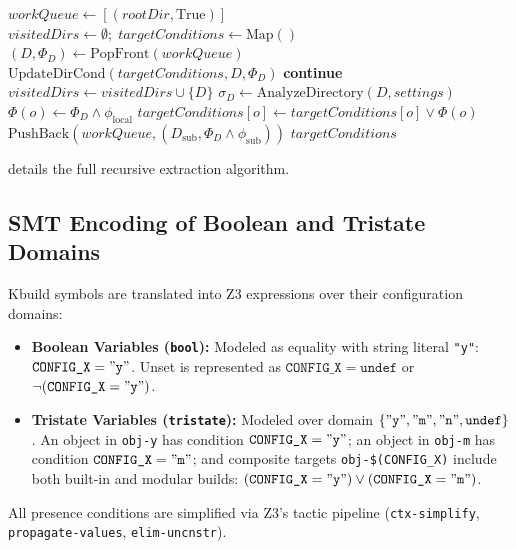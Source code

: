 \documentclass[acmsmall,screen,review]{acmart}
\begin{document}
\begin{algorithm}[t]
\caption{Recursive Hierarchy Traversal and Build Condition Extraction}
\label{alg:recursive-traversal}
\begin{algorithmic}[1]
  \State $\mathit{workQueue} \gets [(\mathit{rootDir}, \text{True})]$
  \State $\mathit{visitedDirs} \gets \emptyset; \; \mathit{targetConditions} \gets \text{Map}()$
    \State $(D, \Phi_D) \gets \mathrm{PopFront}(\mathit{workQueue})$
      \State $\mathrm{UpdateDirCond}(\mathit{targetConditions}, D, \Phi_D)$
      \State \textbf{continue}
    \EndIf
    \State $\mathit{visitedDirs} \gets \mathit{visitedDirs} \cup \{ D \}$
    \State $\sigma_D \gets \mathrm{AnalyzeDirectory}(D, \mathit{settings})$
      \State $\Phi(o) \gets \Phi_D \wedge \phi_{\text{local}}$
      \State $\mathit{targetConditions}[o] \gets \mathit{targetConditions}[o] \vee \Phi(o)$
    \EndFor
      \State $\mathrm{PushBack}(\mathit{workQueue}, (D_{\text{sub}}, \Phi_D \wedge \phi_{\text{sub}}))$
    \EndFor
  \EndWhile
  \State \Return $\mathit{targetConditions}$
\EndFunction
\end{algorithmic}
\end{algorithm}

 details the full recursive extraction algorithm.

\subsection{SMT Encoding of Boolean and Tristate Domains}
\label{sec:traversal:smt}

Kbuild symbols are translated into Z3 expressions over their configuration domains:
\begin{itemize}
\item \textbf{Boolean Variables (\texttt{bool}):} Modeled as equality with string literal \texttt{"y"}: $\texttt{CONFIG\_X} = \mathtt{"y"}$. Unset is represented as $\texttt{CONFIG\_X} = \mathtt{undef}$ or $\neg(\texttt{CONFIG\_X} = \mathtt{"y"})$.
\item \textbf{Tristate Variables (\texttt{tristate}):} Modeled over domain $\{ \mathtt{"y"}, \mathtt{"m"}, \mathtt{"n"}, \mathtt{undef} \}$. An object in \texttt{obj-y} has condition $\texttt{CONFIG\_X} = \mathtt{"y"}$; an object in \texttt{obj-m} has condition $\texttt{CONFIG\_X} = \mathtt{"m"}$; and composite targets \texttt{obj-\$(CONFIG\_X)} include both built-in and modular builds: $(\texttt{CONFIG\_X} = \mathtt{"y"}) \vee (\texttt{CONFIG\_X} = \mathtt{"m"})$.
\end{itemize}
All presence conditions are simplified via Z3's tactic pipeline (\texttt{ctx-simplify}, \texttt{propagate-values}, \texttt{elim-uncnstr}).
\end{document}
